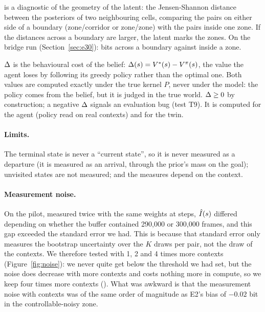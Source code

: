 \documentclass[10pt]{article}
\begin{document}
\emph{\DTwo} is a diagnostic of the geometry of the latent: the Jensen-Shannon distance between the posteriors of two
neighbouring cells, comparing the pairs on either side of a boundary (zone/corridor or zone/zone) with the pairs inside
one zone. If the distances across a boundary are larger, the latent marks the zones. On the bridge run (Section~\ref{sec:e30}):
\eThreeBridgeDTwoBoundary{} bits across a boundary against \eThreeBridgeDTwoWithin{} inside a zone.

\emph{$\Delta$} is the behavioural cost of the belief: $\Delta(s) = V^{*}(s) - V^{\pi}(s)$, the value the agent
loses by following its greedy policy rather than the optimal one. Both values are computed exactly under the true kernel
$P$, never under the model: the policy comes from the belief, but it is judged in the true world.
$\Delta \geq 0$ by construction; a negative $\Delta$ signals an evaluation bug (test T9). %
It is computed for the agent (policy read on real contexts) and for the twin.

\paragraph{Limits.}
The terminal state is never a ``current state'', so it is never measured as a departure (it is measured as an arrival,
through the prior's mass on the goal); unvisited states are not measured; and the measures depend on the context.

\paragraph{Measurement noise.}
On the pilot, measured twice with the same weights at \eThreePilotBudget{} steps, $\hat{I}(s)$ differed depending on whether
the buffer contained 290,000 or 300,000 frames, and this gap exceeded the standard error we had. %
This is because that standard error only measures the bootstrap uncertainty over the $K$ draws per pair, not the draw of
the contexts.
We therefore tested with 1, 2 and 4 times more contexts (Figure~\ref{fig:noise}): we never quite get below the %
threshold we had set, but the noise does decrease with more contexts and costs nothing more in compute, so we keep four
times more contexts (\eThreeContextsFinal).
What was awkward is that the measurement noise with \eThreeContextsPilot{} contexts was of the same order of magnitude as
E2's bias of $-0.02$ bit in the controllable-noisy zone. %
\end{document}
